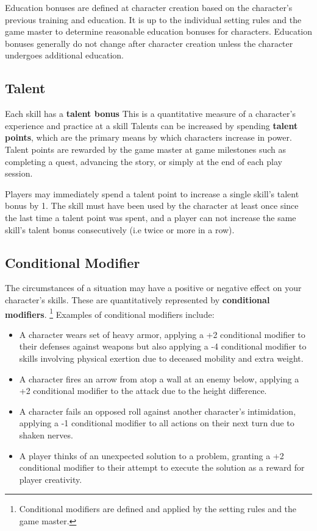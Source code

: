 \documentclass[11pt]{article}
\begin{document}
Education bonuses are defined at character creation based on the character's previous training and education.
It is up to the individual setting rules and the game master to determine reasonable education bonuses for characters.
Education bonuses generally do not change after character creation unless the character undergoes additional education.

\subsection{Talent}
Each skill has a \textbf{talent bonus}
This is a quantitative measure of a character's experience and practice at a skill
Talents can be increased by spending \textbf{talent points}, which are the primary means by which characters increase in power.
Talent points are rewarded by the game master at game milestones such as completing a quest, advancing the story, or simply at the end of each play session.

Players may immediately spend a talent point to increase a single skill's talent bonus by 1.
The skill must have been used by the character at least once since the last time a talent point was spent, and a player can not increase the same skill's talent bonus consecutively (i.e twice or more in a row).

\subsection{Conditional Modifier}
The circumstances of a situation may have a positive or negative effect on your character's skills.
These are quantitatively represented by \textbf{conditional modifiers}.
\footnote{Conditional modifiers are defined and applied by the setting rules and the game master.}
Examples of conditional modifiers include:

\begin{itemize}
	\item A character wears set of heavy armor, applying a +2 conditional modifier to their defenses against weapons but also applying a -4 conditional modifier to skills involving physical exertion due to deceased mobility and extra weight.
	\item A character fires an arrow from atop a wall at an enemy below, applying a +2 conditional modifier to the attack due to the height difference.
	\item A character fails an opposed roll against another character's intimidation, applying a -1 conditional modifier to all actions on their next turn due to shaken nerves.
	\item A player thinks of an unexpected solution to a problem, granting a +2 conditional modifier to their attempt to execute the solution as a reward for player creativity.
\end{itemize}
\end{document}
